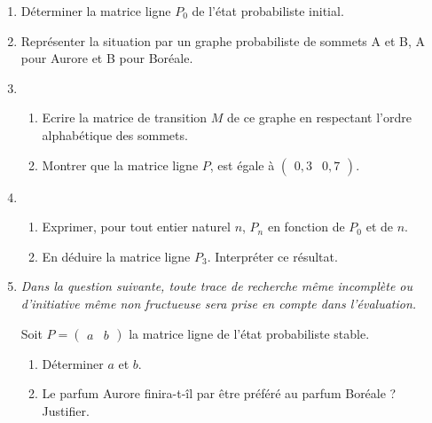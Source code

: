 \begin{enumerate}
     \item
     Déterminer la matrice ligne $P_{0}$ de l'état probabiliste initial.
     \item
     Représenter la situation par un graphe probabiliste de sommets A et B, A pour Aurore et B pour Boréale.
     \item
     \begin{enumerate}[label=\alph*.]
          \item
          Ecrire la matrice de transition $M$ de ce graphe en respectant l'ordre alphabétique des sommets.
          \item
          Montrer que la matrice ligne $P$, est égale à $\begin{pmatrix}0,3 & 0,7 \end{pmatrix}$.
     \end{enumerate}
     \item
     \begin{enumerate}[label=\alph*.]
          \item
          Exprimer, pour tout entier naturel $n$, $P_{n}$ en fonction de $P_{0}$ et de $n$.
          \item
          En déduire la matrice ligne $P_{3}$. Interpréter ce résultat.
     \end{enumerate}
     \item
     \textit{Dans la question suivante, toute trace de recherche même incomplète ou d'initiative même non fructueuse sera prise en compte dans l'évaluation.}
\par
     Soit $P=\begin{pmatrix}a & b \end{pmatrix}$ la matrice ligne de l'état probabiliste stable.
\begin{enumerate}[label=\alph*.]
          \item
          Déterminer $a$ et $b$.
          \item
          Le parfum Aurore finira-t-îl par être préféré au parfum Boréale ? Justifier.
     \end{enumerate}
\end{enumerate}
